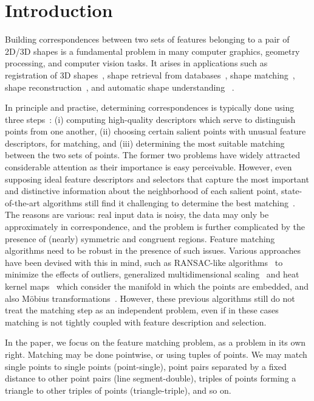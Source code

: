 \section{Introduction}
\label{sec:introduction}

Building correspondences between two sets of features belonging to a pair of 2D/3D shapes 
is a fundamental problem in many computer graphics, geometry processing, and computer vision tasks.
It arises in applications such as
registration of 3D shapes~\cite{Gelfand05,Aiger08,li08,Chang09,Zeng10,vanKaick11,Chang11},
shape retrieval from databases~\cite{Bronstein11},
shape matching~\cite{Berg05,Brown07,Lorenzo08,Tevs09,Ovsjanikov10,Tevs11,SahilliogluY11,Windheuser11},
shape reconstruction~\cite{Brown07,Pekelny08,Wand09,Chang11},
and automatic shape understanding~\cite{Lipman09,Sun10,Kim11} .

In principle and practise, determining correspondences is typically done using three steps~\cite{Johnson99,Lowe04,Sun09,Bokeloh08,Toler10,Leutenegger11}:
(i) computing high-quality descriptors which serve to distinguish points from one another,
(ii) choosing certain salient points with unusual feature descriptors, for matching,
and (iii) determining the most suitable matching between the two sets of points.
The former two problems have widely attracted considerable attention as their importance is easy perceivable.
However, even supposing ideal feature  descriptors and selectors  that capture the most important and distinctive information about the neighborhood of each salient point,
state-of-the-art algorithms  still find it challenging to determine the best matching~\cite{vanKaick11}.
The reasons are various:  real input data is noisy, the data may only be approximately in correspondence,
and the problem is further complicated by the presence of (nearly) symmetric and congruent regions.
Feature matching algorithms need to be robust in the presence of such issues.
Various approaches have been devised with this in mind,
such as RANSAC-like algorithms~\cite{Tevs09,Tevs11} to minimize the effects of outliers,
generalized multidimensional scaling~\cite{Bronstein11} and
heat kernel maps~\cite{Ovsjanikov10} which consider the manifold in which the points are embedded, and also M{\"o}bius transformations~\cite{Lipman09,Kim11}.
However, these previous algorithms still do not treat the matching step as an independent problem, even if in these cases matching is not tightly coupled with feature description and selection.

In the paper, we focus on the feature matching problem, as a problem in its own right.
Matching may be done pointwise, or using tuples of points.
We may match single points to single points (point-single),
point pairs separated by a fixed distance to other point pairs (line segment-double),
triples of points forming a triangle to other triples of points (triangle-triple), and so on.

